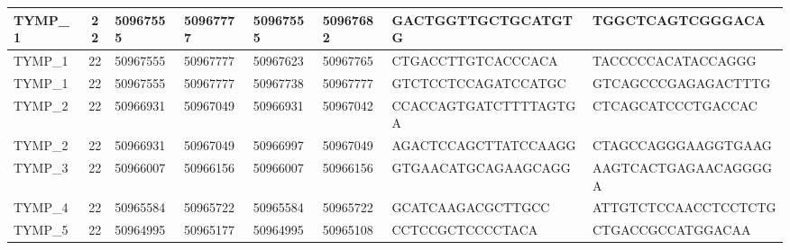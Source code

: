 \begin{landscape}
\begin{longtable}{| p{} | p{} | p{} | p{} | p{} | p{} | p{} | p{} |}
\multicolumn{1}{|l|}{TYMP\_1}    & \multicolumn{1}{c|}{22} & \multicolumn{1}{l|}{50967555}  & \multicolumn{1}{l|}{50967777}  & \multicolumn{1}{l|}{50967555}  & \multicolumn{1}{l|}{50967682}  & \multicolumn{1}{l|}{GACTGGTTGCTGCATGTG}              & \multicolumn{1}{l|}{TGGCTCAGTCGGGACA}              \\ \hline
\multicolumn{1}{|l|}{TYMP\_1}    & \multicolumn{1}{c|}{22} & \multicolumn{1}{l|}{50967555}  & \multicolumn{1}{l|}{50967777}  & \multicolumn{1}{l|}{50967623}  & \multicolumn{1}{l|}{50967765}  & \multicolumn{1}{l|}{CTGACCTTGTCACCCACA}              & \multicolumn{1}{l|}{TACCCCCACATACCAGGG}            \\ \hline
\multicolumn{1}{|l|}{TYMP\_1}    & \multicolumn{1}{c|}{22} & \multicolumn{1}{l|}{50967555}  & \multicolumn{1}{l|}{50967777}  & \multicolumn{1}{l|}{50967738}  & \multicolumn{1}{l|}{50967777}  & \multicolumn{1}{l|}{GTCTCCTCCAGATCCATGC}             & \multicolumn{1}{l|}{GTCAGCCCGAGAGACTTTG}           \\ \hline
\multicolumn{1}{|l|}{TYMP\_2}    & \multicolumn{1}{c|}{22} & \multicolumn{1}{l|}{50966931}  & \multicolumn{1}{l|}{50967049}  & \multicolumn{1}{l|}{50966931}  & \multicolumn{1}{l|}{50967042}  & \multicolumn{1}{l|}{CCACCAGTGATCTTTTAGTGA}           & \multicolumn{1}{l|}{CTCAGCATCCCTGACCAC}            \\ \hline
\multicolumn{1}{|l|}{TYMP\_2}    & \multicolumn{1}{c|}{22} & \multicolumn{1}{l|}{50966931}  & \multicolumn{1}{l|}{50967049}  & \multicolumn{1}{l|}{50966997}  & \multicolumn{1}{l|}{50967049}  & \multicolumn{1}{l|}{AGACTCCAGCTTATCCAAGG}            & \multicolumn{1}{l|}{CTAGCCAGGGAAGGTGAAG}           \\ \hline
\multicolumn{1}{|l|}{TYMP\_3}    & \multicolumn{1}{c|}{22} & \multicolumn{1}{l|}{50966007}  & \multicolumn{1}{l|}{50966156}  & \multicolumn{1}{l|}{50966007}  & \multicolumn{1}{l|}{50966156}  & \multicolumn{1}{l|}{GTGAACATGCAGAAGCAGG}             & \multicolumn{1}{l|}{AAGTCACTGAGAACAGGGGA}          \\ \hline
\multicolumn{1}{|l|}{TYMP\_4}    & \multicolumn{1}{c|}{22} & \multicolumn{1}{l|}{50965584}  & \multicolumn{1}{l|}{50965722}  & \multicolumn{1}{l|}{50965584}  & \multicolumn{1}{l|}{50965722}  & \multicolumn{1}{l|}{GCATCAAGACGCTTGCC}               & \multicolumn{1}{l|}{ATTGTCTCCAACCTCCTCTG}          \\ \hline
\multicolumn{1}{|l|}{TYMP\_5}    & \multicolumn{1}{c|}{22} & \multicolumn{1}{l|}{50964995}  & \multicolumn{1}{l|}{50965177}  & \multicolumn{1}{l|}{50964995}  & \multicolumn{1}{l|}{50965108}  & \multicolumn{1}{l|}{CCTCCGCTCCCCTACA}                & \multicolumn{1}{l|}{CTGACCGCCATGGACAA}             \\ \hline

\end{longtable}
\end{landscape}
